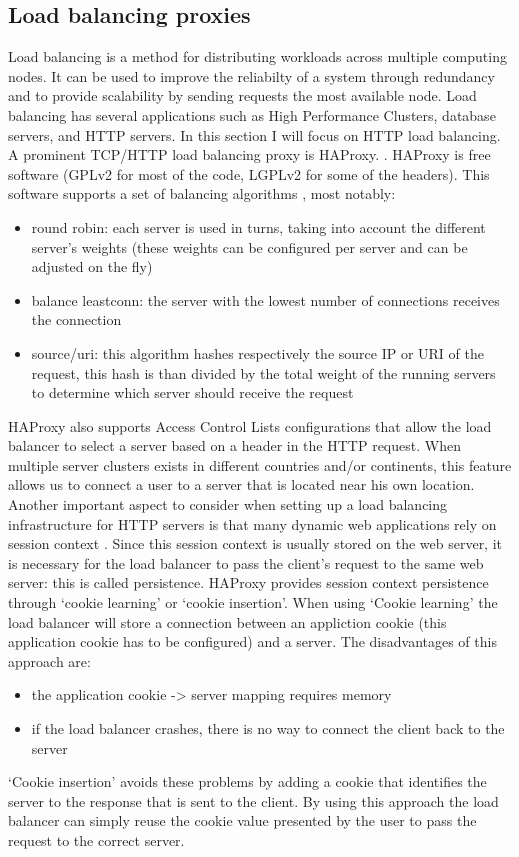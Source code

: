 \documentclass[12pt]{report}
\begin{document}
\subsection{Load balancing proxies}
\label{sec:load_balancing_proxies}
Load balancing is a method for distributing workloads across multiple
computing nodes. It can be used to improve the reliabilty of a system through
redundancy and to provide scalability by sending requests the most
available node.
Load balancing has several applications such as High Performance
Clusters, database servers, and HTTP servers. In this section I will
focus on HTTP load balancing.
A prominent TCP/HTTP load balancing proxy is HAProxy.
\cite{haproxy:2013}. HAProxy is free software (GPLv2 for most of the
code, LGPLv2 for some of the headers). This software supports a set of
balancing algorithms \cite{tarreau:2006}, most notably:
\begin{itemize}
  \item round robin: each server is used in turns, taking into account
    the different server's weights (these weights can be configured
    per server and can be adjusted on the fly)
  \item balance leastconn: the server with the lowest number of connections receives the connection
  \item source/uri: this algorithm hashes respectively the source IP
    or URI of the request, this hash is than divided by the total
    weight of the running servers to determine which server should
    receive the request
\end{itemize}
HAProxy also supports Access Control Lists configurations that allow
the load balancer to select a server based on a header in the HTTP
request. When multiple server clusters exists in different countries
and/or continents, this feature allows us to connect a user to a
server that is located near his own location.
Another important aspect to consider when setting up a load balancing
infrastructure for HTTP servers is that many dynamic web applications
rely on session context \cite{tarreau:2006}. Since this session context is usually stored
on the web server, it is necessary for the load balancer to pass the
client's request to the same web server: this is called persistence.
HAProxy provides session context persistence through `cookie
learning' or `cookie insertion'. When using `Cookie learning' the load
balancer will store a connection between an appliction cookie (this
application cookie has to be configured) and a server. The
disadvantages of this approach are:
\begin{itemize}
  \item the application cookie -> server mapping requires memory
  \item if the load balancer crashes, there is no way to connect the
    client back to the server
\end{itemize}
`Cookie insertion' avoids these problems by adding a cookie that
identifies the server to the response that is sent to the client. By
using this approach the load balancer can simply reuse the
cookie value presented by the user to pass the request to the correct
server.
\end{document}
